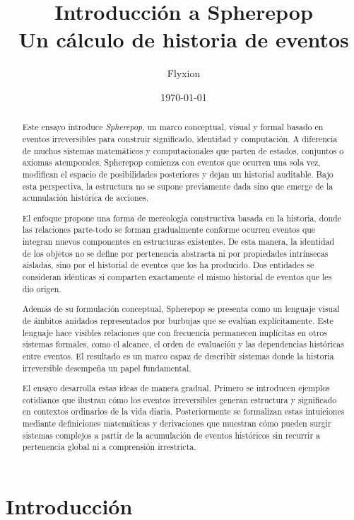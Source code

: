 \documentclass[12pt]{article}
\title{Introducción a Spherepop\\
Un cálculo de historia de eventos}
\author{Flyxion}
\date{\today}
\begin{document}
\maketitle

\begin{abstract}

Este ensayo introduce \emph{Spherepop}, un marco conceptual, visual y formal basado en eventos irreversibles para construir significado, identidad y computación. A diferencia de muchos sistemas matemáticos y computacionales que parten de estados, conjuntos o axiomas atemporales, Spherepop comienza con eventos que ocurren una sola vez, modifican el espacio de posibilidades posteriores y dejan un historial auditable. Bajo esta perspectiva, la estructura no se supone previamente dada sino que emerge de la acumulación histórica de acciones.

El enfoque propone una forma de mereología constructiva basada en la historia, donde las relaciones parte-todo se forman gradualmente conforme ocurren eventos que integran nuevos componentes en estructuras existentes. De esta manera, la identidad de los objetos no se define por pertenencia abstracta ni por propiedades intrínsecas aisladas, sino por el historial de eventos que los ha producido. Dos entidades se consideran idénticas si comparten exactamente el mismo historial de eventos que les dio origen.

Además de su formulación conceptual, Spherepop se presenta como un lenguaje visual de ámbitos anidados representados por burbujas que se evalúan explícitamente. Este lenguaje hace visibles relaciones que con frecuencia permanecen implícitas en otros sistemas formales, como el alcance, el orden de evaluación y las dependencias históricas entre eventos. El resultado es un marco capaz de describir sistemas donde la historia irreversible desempeña un papel fundamental.

El ensayo desarrolla estas ideas de manera gradual. Primero se introducen ejemplos cotidianos que ilustran cómo los eventos irreversibles generan estructura y significado en contextos ordinarios de la vida diaria. Posteriormente se formalizan estas intuiciones mediante definiciones matemáticas y derivaciones que muestran cómo pueden surgir sistemas complejos a partir de la acumulación de eventos históricos sin recurrir a pertenencia global ni a comprensión irrestricta.

\end{abstract}

\newpage
\section{Introducción}
\end{document}
